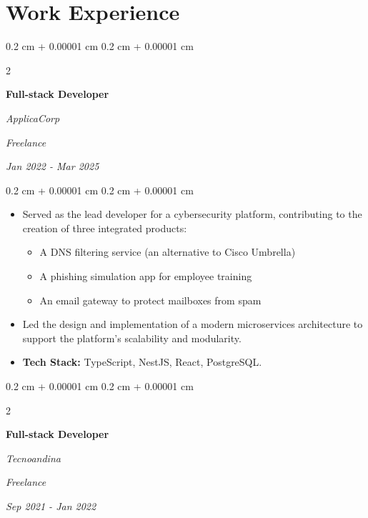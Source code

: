 \documentclass[10pt, letterpaper]{article}
\newenvironment{highlights}{
    \begin{itemize}[
        topsep=0.10 cm,
        parsep=0.10 cm,
        partopsep=0pt,
        itemsep=0pt,
        leftmargin=0.4 cm + 10pt
    ]
}{
    \end{itemize}
} %
\newenvironment{onecolentry}{
    \begin{adjustwidth}{
        0.2 cm + 0.00001 cm
    }{
        0.2 cm + 0.00001 cm
    }
}{
    \end{adjustwidth}
} %
\newenvironment{twocolentry}[2][]{
    \onecolentry
    \def\secondColumn{#2}
    \setcolumnwidth{\fill, 4.5 cm}
    \begin{paracol}{2}
}{
    \switchcolumn \raggedleft \secondColumn
    \end{paracol}
    \endonecolentry
} %
\begin{document}
        \vspace{0.2 cm}


    
    \section{Work Experience}



        
        \begin{twocolentry}{
        \textit{Freelance}    
            
        \textit{Jan 2022 - Mar 2025}}
            \textbf{Full-stack Developer }
            
            \textit{ApplicaCorp}
        \end{twocolentry}

        \vspace{0.10 cm}
        \begin{onecolentry}
            \begin{highlights}
                \item Served as the lead developer for a cybersecurity platform, contributing to the creation of three integrated products:
                \begin{itemize}
                    \item A DNS filtering service (an alternative to Cisco Umbrella)
                    \item A phishing simulation app for employee training
                    \item An email gateway to protect mailboxes from spam
                \end{itemize}

                \item Led the design and implementation of a modern microservices architecture to support the platform’s scalability and modularity.
                \item \textbf{Tech Stack:} TypeScript, NestJS, React, PostgreSQL.
            \end{highlights}
        \end{onecolentry}


        \vspace{0.2 cm}

        \begin{twocolentry}{
        \textit{Freelance}    
            
        \textit{Sep 2021 - Jan 2022}}
            \textbf{Full-stack Developer}
            
            \textit{Tecnoandina}
        \end{twocolentry}
\end{document}
